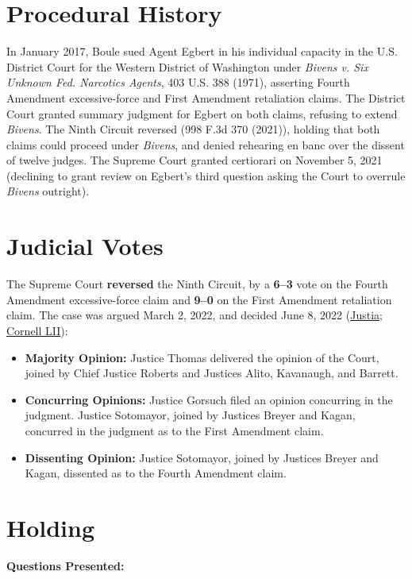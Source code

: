 \documentclass[12pt]{article}
\begin{document}
\section{Procedural History}
In January 2017, Boule sued Agent Egbert in his individual capacity in the U.S. District Court for the Western District of Washington under \textit{Bivens v. Six Unknown Fed. Narcotics Agents}, 403 U.S. 388 (1971), asserting Fourth Amendment excessive-force and First Amendment retaliation claims. The District Court granted summary judgment for Egbert on both claims, refusing to extend \textit{Bivens}. The Ninth Circuit reversed (998 F.3d 370 (2021)), holding that both claims could proceed under \textit{Bivens}, and denied rehearing en banc over the dissent of twelve judges. The Supreme Court granted certiorari on November 5, 2021 (declining to grant review on Egbert's third question asking the Court to overrule \textit{Bivens} outright).

\section{Judicial Votes}
The Supreme Court \textbf{reversed} the Ninth Circuit, by a \textbf{6--3} vote on the Fourth Amendment excessive-force claim and \textbf{9--0} on the First Amendment retaliation claim. The case was argued March 2, 2022, and decided June 8, 2022 (\href{https://supreme.justia.com/cases/federal/us/596/21-147/}{Justia}; \href{https://www.law.cornell.edu/supremecourt/text/21-147}{Cornell LII}):

\begin{itemize}
    \item \textbf{Majority Opinion:} Justice Thomas delivered the opinion of the Court, joined by Chief Justice Roberts and Justices Alito, Kavanaugh, and Barrett.
    \item \textbf{Concurring Opinions:} Justice Gorsuch filed an opinion concurring in the judgment. Justice Sotomayor, joined by Justices Breyer and Kagan, concurred in the judgment as to the First Amendment claim.
    \item \textbf{Dissenting Opinion:} Justice Sotomayor, joined by Justices Breyer and Kagan, dissented as to the Fourth Amendment claim.
\end{itemize}

\section{Holding}
\textbf{Questions Presented:}
\end{document}
